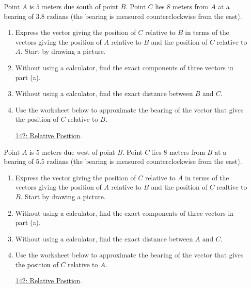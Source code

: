 \documentclass{ximera}
\begin{document}
\begin{question}  \label{Q9dfrwDSFD}
Point $A$ is $5$ meters due south of point $B$. Point $C$ lies $8$ meters from $A$ at a bearing of $3.8$ radians (the bearing is measured counterclockwise from the east).

\begin{enumerate}
\item Express the vector giving the position of $C$ relative to $B$ in terms of the vectors giving the position of $A$ relative to $B$ and the position of $C$ relative to $A$. Start by drawing a picture.

\item Without using a calculator, find the exact components of three vectors in part (a).

\item Without using a calculator, find the exact distance between $B$ and $C$.

\item Use the worksheet below to approximate the bearing  of the vector that gives the position of $C$ relative to $B$.

\href{https://www.geogebra.org/classic/bhdsgxtx}{142: Relative Position}.

 
\begin{onlineOnly}
    \begin{center}
\end{center}
\end{onlineOnly}
\end{enumerate}
\end{question}

\begin{question}  \label{Q9dferevdeewDSFD}
Point $A$ is $5$ meters due west of point $B$. Point $C$ lies $8$ meters from $B$ at a bearing of $5.5$ radians (the bearing is measured counterclockwise from the east).

\begin{enumerate}
\item Express the vector giving the position of $C$ relative to $A$ in terms of the vectors giving the position of $A$ relative to $B$ and the position of $C$ realtive to $B$. Start by drawing a picture.

\item Without using a calculator, find the exact components of three vectors in part (a).

\item Without using a calculator, find the exact distance between $A$ and $C$.

\item Use the worksheet below to approximate the bearing of the vector that gives the position of $C$ relative to $A$.

\href{https://www.geogebra.org/classic/bhdsgxtx}{142: Relative Position}.

 
\begin{onlineOnly}
    \begin{center}
\end{center}
\end{onlineOnly}
\end{enumerate}
\end{question}
\end{document}
